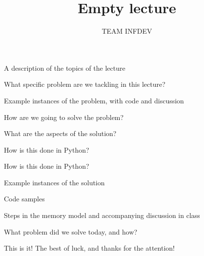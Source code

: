 \documentclass{beamer}
\title{Empty lecture}
\author{TEAM INFDEV}
\institute{Hogeschool Rotterdam \\ 
Rotterdam, Netherlands}
\date{}
\begin{document}
\maketitle

\begin{slide}{
\item A description of the topics of the lecture
}\end{slide}

\begin{slide}{
\item What specific problem are we tackling in this lecture?
}\end{slide}

\begin{slide}{
\item Example instances of the problem, with code and discussion
}\end{slide}

\begin{slide}{
\item How are we going to solve the problem?
}\end{slide}

\begin{slide}{
\item What are the aspects of the solution?
}\end{slide}

\begin{slide}{
\item How is this done in Python?
}\end{slide}

\begin{slide}{
\item How is this done in Python?
}\end{slide}

\begin{slide}{
\item Example instances of the solution
\item Code samples
\item Steps in the memory model and accompanying discussion in class
}\end{slide}

\begin{slide}{
\item What problem did we solve today, and how?
}\end{slide}

\begin{frame}{This is it!}
\center
\fontsize{18pt}{7.2}\selectfont
The best of luck, and thanks for the attention!
\end{frame}
\end{document}
